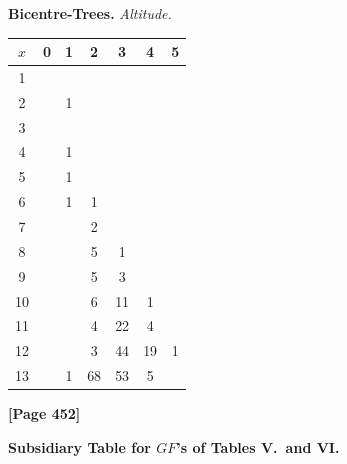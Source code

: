 \documentclass[11pt,a4paper]{article}
\begin{document}
\begin{small}
\noindent\textbf{Bicentre-Trees.} \textit{Altitude.}
\begin{center}
\begin{tabular}{|c|cccccc|}
\hline
$x$ & 0 & 1 & 2 & 3 & 4 & 5 \\
\hline
1 & & & & & & \\
2 & & 1 & & & & \\
3 & & & & & & \\
4 & & 1 & & & & \\
5 & & 1 & & & & \\
6 & & 1 & 1 & & & \\
7 & & & 2 & & & \\
8 & & & 5 & 1 & & \\
9 & & & 5 & 3 & & \\
10 & & & 6 & 11 & 1 & \\
11 & & & 4 & 22 & 4 & \\
12 & & & 3 & 44 & 19 & 1 \\
13 & & 1 & 68 & 53 & 5 & \\
\hline
\end{tabular}
\end{center}
\end{small}

\newpage
\textbf{[Page 452]}

\begin{center}
\textbf{Subsidiary Table for $GF$'s of Tables V.\ and VI.}
\end{center}
\end{document}
